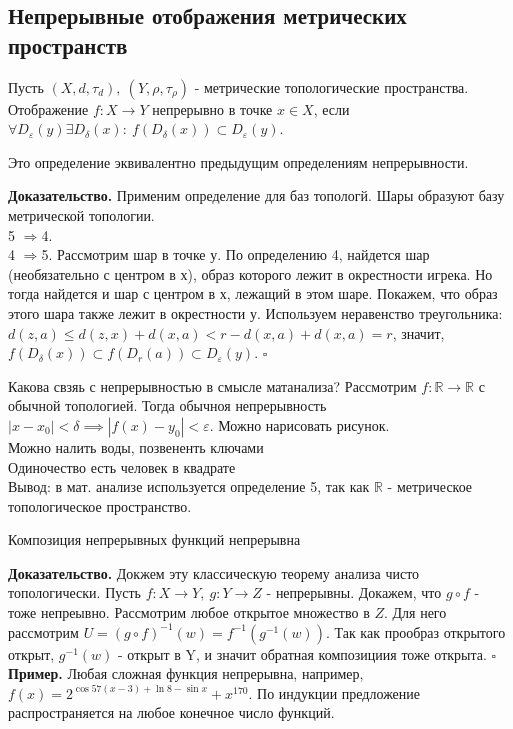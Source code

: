 \subsection{Непрерывные отображения метрических пространств}
\begin{defin}
Пусть $(X,d,\tau_d),~(Y,\rho,\tau_\rho)$ - метрические топологические 
пространства. Отображение  $f\colon X\to Y$ непрерывно в точке  $x\in X$,
если  $\forall D_\varepsilon(y)\exists D_{\delta}(x):~f(D_\delta(x))\subset 
D_\varepsilon(y)$.
\end{defin}
\begin{theor}
Это определение эквивалентно предыдущим определениям непрерывности. 
\end{theor}
\textbf{Доказательство.}  Применим определение для баз топологй. Шары образуют
базу метрической топологии.\\
5 $\Rightarrow$4. \\
4 $\Rightarrow$5. Рассмотрим шар в точке у. По определению 4, найдется шар
(необязательно с центром в х), образ которого лежит в окрестности игрека. 
Но тогда найдется и шар с центром в х, лежащий в этом шаре. Покажем,
что образ этого шара также лежит в окрестности у. Используем неравенство
треугольника: $d(z,a)\leqslant d(z,x)+d(x,a)<r-d(x,a)+d(x,a)=r$, значит,
$f(D_\delta(x))\subset f(D_r(a))\subset D_\varepsilon(y)$.
$\square$ 

Какова свзяь с непрерывностью в смысле матанализа? Рассмотрим
$f\colon \mathbb{R}\to\mathbb{R}$ с обычной топологией. 
Тогда обычноя непрерывность $|x-x_0|<\delta\implies|f(x)-y_0|<\varepsilon$.
Можно нарисовать рисунок.\\
Можно налить воды, позвененть ключами\\
Одиночество есть человек в квадрате\\
Вывод: в мат. анализе используется определение 5, так как $\mathbb{R}$ - 
метрическое топологическое пространство. 
\begin{theor}
Композиция непрерывных функций непрерывна
\end{theor}
\textbf{Доказательство.}  Докжем эту классическую теорему анализа чисто
топологически. Пусть $f\colon X\to Y,~g\colon Y\to Z$ - непрерывны.
Докажем, что  $g\circ f$ - тоже непреывно. Рассмотрим любое открытое множество в 
$Z$. Для него рассмотрим  $U=(g\circ f)^{-1}(w)=f^{-1}(g^{-1}(w))$. 
Так как прообраз открытого открыт,  $g^{-1}(w)$ - открыт в Y, и значит
обратная композициия тоже открыта. $\square$\\
\textbf{Пример.} Любая сложная функция непрерывна, например, $f(x)=2^{\cos
{57(x-3)}+\ln{8-\sin x}}+x^170$. По индукции предложение распространяется на 
любое конечное число функций. 

